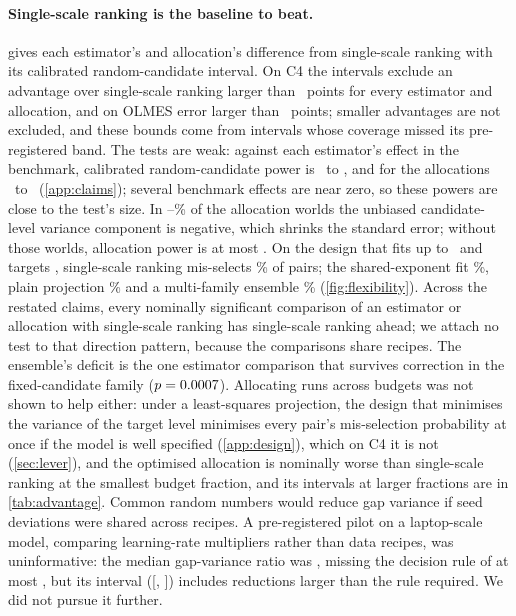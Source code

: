 \documentclass{article}
\begin{document}
\paragraph{Single-scale ranking is the baseline to beat.} 
gives each estimator's and allocation's difference from single-scale ranking with
its calibrated random-candidate interval. On C4 the intervals exclude an advantage
over single-scale ranking larger than \advExcludeCFourMax\ points for every
estimator and allocation, and on OLMES error larger than \advExcludeOlmesMax\
points; smaller advantages are not excluded, and these bounds come from
intervals whose coverage missed its pre-registered band. The tests are weak:
against each estimator's effect in the benchmark, calibrated random-candidate
power is \advPowerMin\ to \advPowerMax, and for the allocations \allocPowerMin\
to \allocPowerMax\ (\cref{app:claims}); several benchmark effects are near zero,
so these powers are close to the test's size. In
\allocZetaNegMin--\allocZetaNegMax\% of the allocation worlds the unbiased
candidate-level variance component is negative, which shrinks the standard
error; without those worlds, allocation power is at most
\allocPowerNonnegMax. On the design that
fits up to \flexFitTop\ and targets \flexTarget, single-scale ranking mis-selects
\flexSingle\% of pairs; the shared-exponent fit \flexShared\%, plain projection
\flexPlain\% and a multi-family ensemble \flexEnsemble\% (\cref{fig:flexibility}).
Across the restated claims, every nominally significant comparison of an
estimator or allocation with single-scale ranking has single-scale ranking
ahead; we attach no test to that direction pattern, because the comparisons
share recipes. The ensemble's deficit is the one estimator comparison that
survives correction in the fixed-candidate family ($p=0.0007$). Allocating
runs across budgets was not shown to help either: under a least-squares projection, the
design that minimises the variance of the target level minimises every pair's
mis-selection probability at once if the model is well specified
(\cref{app:design}), which on C4 it is not (\cref{sec:lever}), and the optimised
allocation is nominally worse than single-scale ranking at the smallest budget
fraction, and its intervals at larger fractions are in \cref{tab:advantage}. Common random
numbers would reduce gap variance if seed deviations were shared across
recipes. A pre-registered pilot on a laptop-scale model, comparing learning-rate
multipliers rather than data recipes, was uninformative: the median
gap-variance ratio was \crnMedianRatio, missing the decision rule of at most
\crnRule, but its interval ([\crnLow, \crnHigh]) includes reductions larger than
the rule required. We did not pursue it further.
\end{document}

